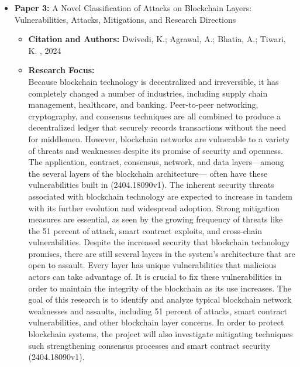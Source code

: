\documentclass[12pt,a4paper]{article}
\begin{document}
\begin{itemize}
     \item \textbf{Paper 3:} A Novel Classification of Attacks on Blockchain Layers: Vulnerabilities,
Attacks, Mitigations, and Research Directions
    \begin{itemize}
        \item \textbf{Citation and Authors:}
        Dwivedi, K.; Agrawal, A.; Bhatia, A.; Tiwari, K. \cite{dwivedi_2024_a}, 2024
        \item \textbf{Research Focus:} \\
Because blockchain technology is decentralized and irreversible, it has completely
changed a number of industries, including supply chain management, healthcare, and
banking. Peer-to-peer networking, cryptography, and consensus techniques are all
combined to produce a decentralized ledger that securely records transactions without
the need for middlemen.
However, blockchain networks are vulnerable to a variety of threats and weaknesses
despite its promise of security and openness. The application, contract, consensus,
network, and data layers—among the several layers of the blockchain architecture—
often have these vulnerabilities built in (2404.18090v1). The inherent security threats
associated with blockchain technology are expected to increase in tandem with its
further evolution and widespread adoption. Strong mitigation measures are essential,
as seen by the growing frequency of threats like the 51 percent of attack, smart contract exploits,
and cross-chain vulnerabilities.
Despite the increased security that blockchain technology promises, there are still
several layers in the system's architecture that are open to assault. Every layer has
unique vulnerabilities that malicious actors can take advantage of. It is crucial to fix
these vulnerabilities in order to maintain the integrity of the blockchain as its use
increases.
The goal of this research is to identify and analyze typical blockchain network
weaknesses and assaults, including 51 percent of attacks, smart contract vulnerabilities, and
other blockchain layer concerns. In order to protect blockchain systems, the project will
also investigate mitigating techniques such strengthening consensus processes and
smart contract security (2404.18090v1).


\end{itemize}
\end{itemize}
\end{document}
